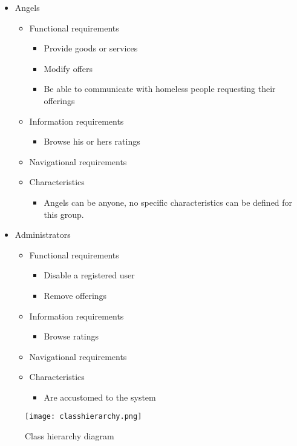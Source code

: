 \documentclass[a4paper]{report}
\begin{document}
\begin{itemize}
\item Angels
\begin{itemize}
\item Functional requirements
\begin{itemize}
	\item Provide goods or services
	\item Modify offers
	\item Be able to communicate with homeless people requesting their offerings
\end{itemize}
\item Information requirements
\begin{itemize}
	\item Browse his or hers ratings
\end{itemize}
\item Navigational requirements
\item Characteristics
\begin{itemize}
	\item Angels can be anyone, no specific characteristics can be defined for this group.
\end{itemize}
\end{itemize}

\item Administrators
\begin{itemize}
\item Functional requirements
\begin{itemize}
	\item Disable a registered user
	\item Remove offerings
\end{itemize}
\item Information requirements
\begin{itemize}
	\item Browse ratings
\end{itemize}
\item Navigational requirements
\item Characteristics
\begin{itemize}
	\item Are accustomed to the system
\end{itemize}
\end{itemize}

\end{itemize}

\begin{figure}[htp]
\centering
\texttt{[image: classhierarchy.png]}
\caption{Class hierarchy diagram}
\label{fig:classhierarchy}
\end{figure}



\chapter{}


\chapter{}
\end{document}
